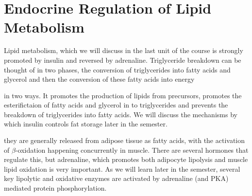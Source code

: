\documentclass{tufte-handout}
\begin{document}
\section{Endocrine Regulation of Lipid Metabolism}

Lipid metabolism, which we will discuss in the last unit of the course is strongly promoted by insulin and reversed by adrenaline.  Triglyceride breakdown can be thought of in two phases, the conversion of triglycerides into fatty acids and glycerol and then the conversion of these fatty acids into energy  

 in two ways.  It promotes the production of lipids from precursors, promotes the esterifictaion of fatty acids and glycerol in to triglycerides and prevents the breakdown of triglycerides into fatty acids.  We will discuss the mechanisms by which insulin controls fat storage later in the semester.

 they are generally released from adipose tissue as fatty acids, with the activation of $\beta$-oxidation happening concurrently in muscle.  There are several hormones that regulate this, but adrenaline, which promotes both adipocyte lipolysis and muscle lipid oxidation is very important.  As we will learn later in the semester, several key lipolytic and oxidative enzymes are activated by adrenaline (and PKA) mediated protein phosphorylation.



\end{document}
